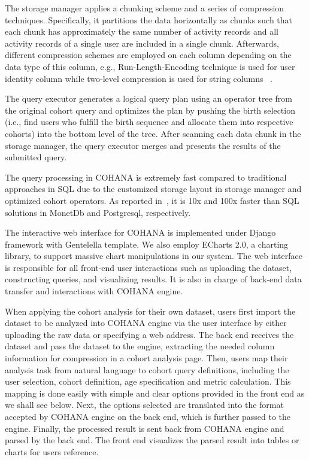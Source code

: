 The storage manager applies a chunking scheme and a series of compression techniques. Specifically, it partitions the data horizontally as chunks such that each chunk has approximately the same number of activity records and all activity records of a single user are included in a single chunk. Afterwards, different compression schemes are employed on each column depending on the data type of this column, e.g., Run-Length-Encoding technique is used for user identity column while two-level compression is used for string columns ~\cite{jiang2016cohort}. %

The query executor generates a logical query plan using an operator tree from the original cohort query and optimizes the plan by pushing the birth selection (i.e., find users who fulfill the birth sequence and allocate them into respective cohorts) into the bottom level of the tree. After scanning each data chunk in the storage manager, the query executor merges and presents the results of the submitted query.

The query processing in COHANA is extremely fast compared to traditional approaches in SQL due to the customized storage layout in storage manager and optimized cohort operators. As reported in~\cite{jiang2016cohort}, it is 10x and 100x faster than SQL solutions in MonetDb\cite{boncz2005monetdb} and Postgresql\cite{momjian2001postgresql}, respectively.

The interactive web interface for COHANA is implemented under Django\cite{django} framework with Gentelella\cite{gentelella} template. We also employ ECharts 2.0\cite{echarts}, a charting library, to support massive chart manipulations in our system. 
The web interface is responsible for all front-end user interactions such as uploading the dataset, constructing queries, and visualizing results. 
It is also in charge of back-end data transfer and interactions with COHANA engine. 

When applying the cohort analysis for their own dataset, users first import the dataset to be analyzed into COHANA engine via the user interface by either uploading the raw data or specifying a web address.
The back end receives the dataset and pass the dataset to the engine, extracting the needed column information for compression in a cohort analysis page. 
Then, users map their analysis task from natural language to cohort query definitions, including the user selection, cohort definition, age specification and metric calculation.
This mapping is done easily with simple and clear options provided in the front end as we shall see below.
Next, the options selected are translated into the format accepted by COHANA engine on the back end, which is further passed to the engine. 
Finally, the processed result is sent back from COHANA engine and parsed by the back end. The front end visualizes the parsed result into tables or charts for users reference.


